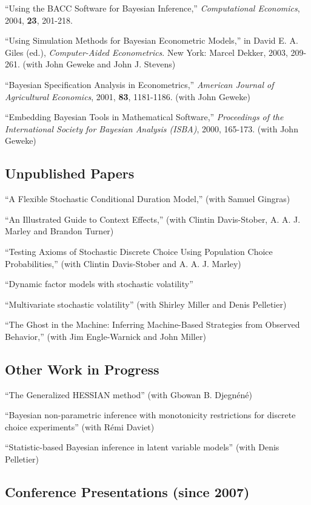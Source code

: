 \documentclass[12pt]{article}
\begin{document}
``Using the BACC Software for Bayesian Inference,'' {\it Computational Economics},
2004,
{\bf 23}, 201-218.

``Using Simulation Methods for Bayesian Econometric Models,''  in  David E. A. Giles (ed.), {\it Computer-Aided Econometrics}.
New York: Marcel Dekker, 2003, 209-261. (with John Geweke and John J. Stevens)

``Bayesian Specification Analysis in Econometrics,''  {\it American Journal of Agricultural Economics},
2001,
{\bf 83}, 1181-1186. (with John Geweke)

``Embedding Bayesian Tools in Mathematical Software,''  {\it Proceedings of the International Society for Bayesian Analysis (ISBA)}, 
2000, 165-173.
 (with John Geweke)

\subsection*{Unpublished Papers}

``A Flexible Stochastic Conditional Duration Model,''
(with Samuel Gingras)

``An Illustrated Guide to Context Effects,''
(with Clintin Davis-Stober, A. A. J. Marley and Brandon Turner)

``Testing Axioms of Stochastic Discrete Choice Using Population Choice Probabilities,'' (with Clintin Davis-Stober and A. A. J. Marley)

``Dynamic factor models with stochastic volatility''

``Multivariate stochastic volatility'' (with Shirley Miller and Denis Pelletier)

``The Ghost in the Machine: Inferring Machine-Based Strategies from Observed Behavior,'' (with Jim Engle-Warnick and John Miller)

\subsection*{Other Work in Progress}

``The Generalized HESSIAN method'' (with Gbowan B. Djegn\'en\'e)

``Bayesian non-parametric inference with monotonicity restrictions for discrete choice experiments'' (with R\'emi Daviet)

``Statistic-based Bayesian inference in latent variable models'' (with Denis Pelletier)

\subsection*{Conference Presentations (since 2007)}
\end{document}
